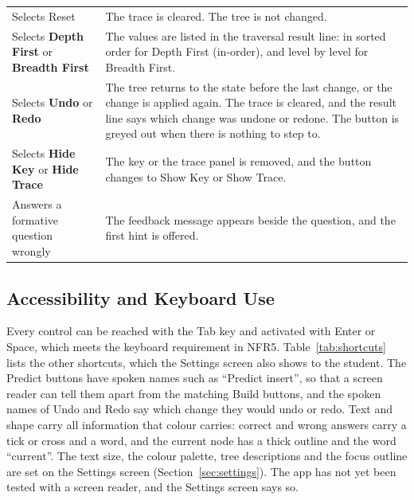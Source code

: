\begin{table}[H]
\begin{tabularx}{\textwidth}{p{4.2cm} X}
Selects Reset & The trace is cleared. The tree is not changed. \\
Selects \textbf{Depth First} or \textbf{Breadth First} & The values are listed in the traversal result line: in sorted order for Depth First (in-order), and level by level for Breadth First. \\
Selects \textbf{Undo} or \textbf{Redo} & The tree returns to the state before the last change, or the change is applied again. The trace is cleared, and the result line says which change was undone or redone. The button is greyed out when there is nothing to step to. \\
Selects \textbf{Hide Key} or \textbf{Hide Trace} & The key or the trace panel is removed, and the button changes to Show Key or Show Trace. \\
Answers a formative question wrongly & The feedback message appears beside the question, and the first hint is offered. \\
\bottomrule
\end{tabularx}
\end{table}

\subsection{Accessibility and Keyboard Use}
Every control can be reached with the Tab key and activated with Enter or Space, which meets the keyboard requirement in NFR5. Table~\ref{tab:shortcuts} lists the other shortcuts, which the Settings screen also shows to the student. The Predict buttons have spoken names such as ``Predict insert'', so that a screen reader can tell them apart from the matching Build buttons, and the spoken names of Undo and Redo say which change they would undo or redo. Text and shape carry all information that colour carries: correct and wrong answers carry a tick or cross and a word, and the current node has a thick outline and the word ``current''. The text size, the colour palette, tree descriptions and the focus outline are set on the Settings screen (Section~\ref{sec:settings}). The app has not yet been tested with a screen reader, and the Settings screen says so.

